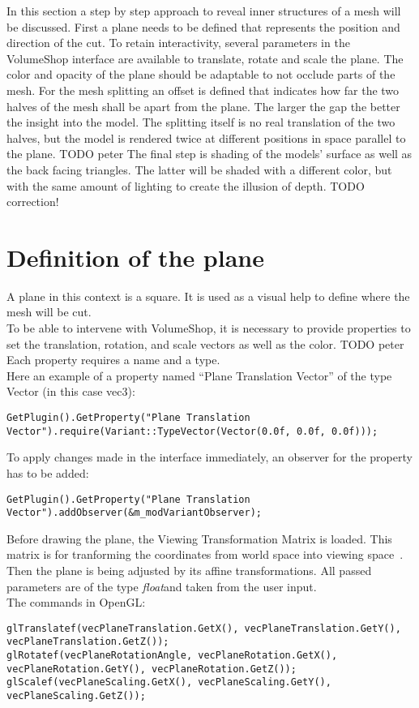 
In this section a step by step approach to reveal inner structures of a mesh will be discussed. First a plane needs to be defined that represents the position and direction of the cut. To retain interactivity, several parameters in the VolumeShop interface are available to translate, rotate and scale the plane. The color and opacity of the plane should be adaptable to not occlude parts of the mesh. For the mesh splitting an offset is defined that indicates how far the two halves of the mesh shall be apart from the plane. The larger the gap the better the insight into the model. The splitting itself is no real translation of the two halves, but the model is rendered twice at different positions in space parallel to the plane. 
TODO peter
The final step is shading of the models' surface as well as the back facing triangles. The latter will be shaded with a different color, but with the same amount of lighting to create the illusion of depth.
TODO correction!

\section{Definition of the plane}
\label{chap:planeDefinition}
A plane in this context is a square. It is used as a visual help to define where the mesh will be cut.\\
To be able to intervene with VolumeShop, it is necessary to provide properties to set the translation, rotation, and scale vectors as well as the color.
TODO peter
Each property requires a name and a type.\\
Here an example of a property named "`Plane Translation Vector"' of the type Vector (in this case vec3):
\begin{lstlisting}
GetPlugin().GetProperty("Plane Translation Vector").require(Variant::TypeVector(Vector(0.0f, 0.0f, 0.0f)));
\end{lstlisting}

To apply changes made in the interface immediately, an observer for the property has to be added:
\begin{lstlisting}
GetPlugin().GetProperty("Plane Translation Vector").addObserver(&m_modVariantObserver);
\end{lstlisting}

Before drawing the plane, the Viewing Transformation Matrix is loaded. This matrix is for tranforming the coordinates from world space into viewing space~\cite{book:computerGraphicsHearn}.\\
Then the plane is being adjusted by its affine transformations. All passed parameters are of the type \emph{float}and taken from the user input.\\
The commands in OpenGL:
\begin{lstlisting}
glTranslatef(vecPlaneTranslation.GetX(), vecPlaneTranslation.GetY(), vecPlaneTranslation.GetZ());
glRotatef(vecPlaneRotationAngle, vecPlaneRotation.GetX(), vecPlaneRotation.GetY(), vecPlaneRotation.GetZ());
glScalef(vecPlaneScaling.GetX(), vecPlaneScaling.GetY(), vecPlaneScaling.GetZ());
\end{lstlisting}


